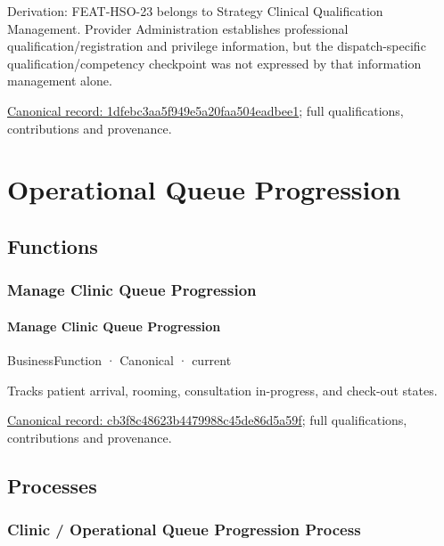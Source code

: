 Derivation: FEAT-HSO-23 belongs to Strategy Clinical Qualification Management. Provider Administration establishes professional qualification/registration and privilege information, but the dispatch-specific qualification/competency checkpoint was not expressed by that information management alone.


{\footnotesize \href{../../../../continuum/business/business-function/1dfebc3aa5f949e5a20faa504eadbee1.md}{Canonical record: 1dfebc3aa5f949e5a20faa504eadbee1}; full qualifications, contributions and provenance.}\par
\section{Operational Queue Progression}

\subsection{Functions}

\subsubsection{Manage Clinic Queue Progression}

\paragraph{Manage Clinic Queue Progression}

\label{element:cb3f8c48623b4479988c45de86d5a59f}
{\small BusinessFunction · Canonical · current}\par

Tracks patient arrival, rooming, consultation in-progress, and check-out states.


{\footnotesize \href{../../../../continuum/business/business-function/cb3f8c48623b4479988c45de86d5a59f.md}{Canonical record: cb3f8c48623b4479988c45de86d5a59f}; full qualifications, contributions and provenance.}\par
\subsection{Processes}

\subsubsection{Clinic / Operational Queue Progression Process}

